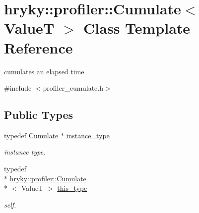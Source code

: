 \hypertarget{classhryky_1_1profiler_1_1_cumulate}{\section{hryky\-:\-:profiler\-:\-:Cumulate$<$ Value\-T $>$ Class Template Reference}
\label{classhryky_1_1profiler_1_1_cumulate}
}


cumulates an elapsed time.  




{\ttfamily \#include $<$profiler\-\_\-cumulate.\-h$>$}

\subsection*{Public Types}
\begin{DoxyCompactItemize}
\item 
\hypertarget{classhryky_1_1profiler_1_1_cumulate_a2f40d09f296a528c8b8fd707b3681534}{typedef \hyperlink{classhryky_1_1profiler_1_1_cumulate}{Cumulate} $\ast$ \hyperlink{classhryky_1_1profiler_1_1_cumulate_a2f40d09f296a528c8b8fd707b3681534}{instance\-\_\-type}}\label{classhryky_1_1profiler_1_1_cumulate_a2f40d09f296a528c8b8fd707b3681534}

\begin{DoxyCompactList}\small\item\em instance type. \end{DoxyCompactList}\item 
\hypertarget{classhryky_1_1profiler_1_1_cumulate_a940a94f3263b46fa9073b0e99561f39d}{typedef \\*
\hyperlink{classhryky_1_1profiler_1_1_cumulate}{hryky\-::profiler\-::\-Cumulate}\\*
$<$ Value\-T $>$ \hyperlink{classhryky_1_1profiler_1_1_cumulate_a940a94f3263b46fa9073b0e99561f39d}{this\-\_\-type}}\label{classhryky_1_1profiler_1_1_cumulate_a940a94f3263b46fa9073b0e99561f39d}

\begin{DoxyCompactList}\small\item\em self. \end{DoxyCompactList}\end{DoxyCompactItemize}
